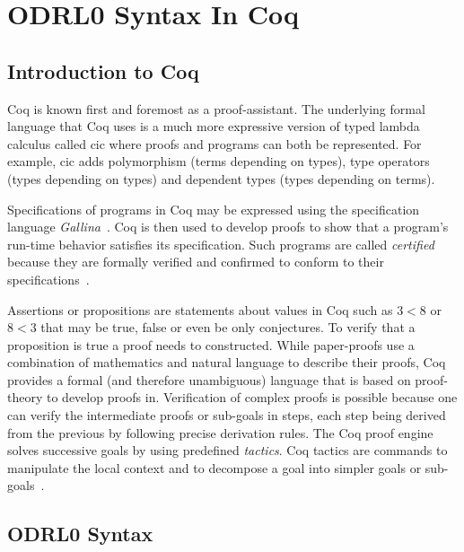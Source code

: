 \chapter{ODRL0 Syntax In Coq}\label{chap:odrl0syntaxcoq}

\section{Introduction to Coq}

Coq is known first and foremost as a proof-assistant. The underlying formal language that Coq uses is a much more expressive version of typed lambda calculus called \ac{cic} where proofs and programs can both be represented. For example, \ac{cic} adds polymorphism (terms depending on types), type operators (types depending on types) and dependent types (types depending on terms).

Specifications of programs in Coq may be expressed using the specification language \emph{Gallina}~\cite{gallinaref}. Coq is then used to develop proofs to show that a program's run-time behavior satisfies its specification. Such programs are called \emph{certified} because they are formally verified and confirmed to conform to their specifications~\cite{BC04}.

Assertions or propositions are statements about values in Coq such as $3<8$ or $8<3$ that may be true, false or even be only conjectures. To verify that a proposition is true a proof needs to constructed. While paper-proofs use a combination of mathematics and natural language to describe their proofs, Coq provides a formal (and therefore unambiguous) language that is based on proof-theory to develop proofs in. Verification of complex proofs is possible because one can verify the intermediate proofs or sub-goals in steps, each step being derived from the previous by following precise derivation rules. The Coq proof engine solves successive goals by using predefined \emph{tactics}. Coq tactics are commands to manipulate the local context and to decompose a goal into simpler goals or sub-goals~\cite{BC04}.

\section{ODRL0 Syntax}\label{sec:agreementConstructor}

